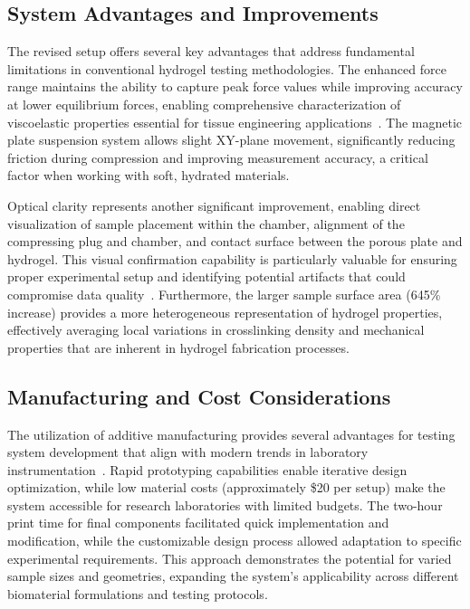 \subsection{System Advantages and Improvements}

The revised setup offers several key advantages that address fundamental limitations in conventional hydrogel testing methodologies. The enhanced force range maintains the ability to capture peak force values while improving accuracy at lower equilibrium forces, enabling comprehensive characterization of viscoelastic properties essential for tissue engineering applications~\cite{nichol2010cellviability,xiao2013mechanicaltesting,schinagl1997depthdependentconfined, schinagl1996videomicroscopy,seitz2013stressrelaxationresponse}. The magnetic plate suspension system allows slight XY-plane movement, significantly reducing friction during compression and improving measurement accuracy, a critical factor when working with soft, hydrated materials.

Optical clarity represents another significant improvement, enabling direct visualization of sample placement within the chamber, alignment of the compressing plug and chamber, and contact surface between the porous plate and hydrogel. This visual confirmation capability is particularly valuable for ensuring proper experimental setup and identifying potential artifacts that could compromise data quality~\cite{antoine2014review, elkommos2025hybridhydrogels, watasestressrelaxation,buschmannconfinedcompression, patel2019systematicreview}. Furthermore, the larger sample surface area (645\% increase) provides a more heterogeneous representation of hydrogel properties, effectively averaging local variations in crosslinking density and mechanical properties that are inherent in hydrogel fabrication processes.

\subsection{Manufacturing and Cost Considerations}

The utilization of additive manufacturing provides several advantages for testing system development that align with modern trends in laboratory instrumentation~\cite{bercea2024recent, seitz2013stressrelaxationresponse, patel2019systematicreview, schinagl1997depthdependentconfined, ngo2018additivemanufacturing}. Rapid prototyping capabilities enable iterative design optimization, while low material costs (approximately \$20 per setup) make the system accessible for research laboratories with limited budgets. The two-hour print time for final components facilitated quick implementation and modification, while the customizable design process allowed adaptation to specific experimental requirements. This approach demonstrates the potential for varied sample sizes and geometries, expanding the system's applicability across different biomaterial formulations and testing protocols.

